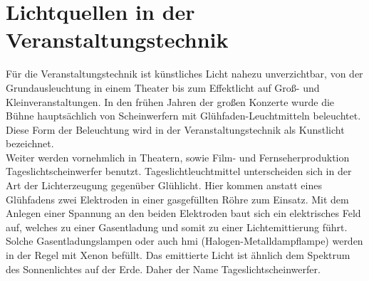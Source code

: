 \documentclass[11pt]{scrartcl}
\begin{document}
\section{Lichtquellen in der Veranstaltungstechnik}
Für die Veranstaltungstechnik ist künstliches Licht nahezu unverzichtbar, von der Grundausleuchtung in einem Theater bis zum Effektlicht
auf Groß- und Kleinveranstaltungen. In den frühen Jahren der großen Konzerte wurde die Bühne hauptsächlich von Scheinwerfern mit
Glühfaden-Leuchtmitteln beleuchtet. Diese Form der Beleuchtung wird in der Veranstaltungstechnik als Kunstlicht bezeichnet.\\
Weiter werden vornehmlich in Theatern, sowie Film- und Fernseherproduktion Tageslichtscheinwerfer benutzt. Tageslichtleuchtmittel
unterscheiden sich in der Art der Lichterzeugung gegenüber Glühlicht. Hier kommen anstatt eines Glühfadens zwei Elektroden in einer
gasgefüllten Röhre zum Einsatz. Mit dem Anlegen einer Spannung an den beiden Elektroden baut sich ein elektrisches Feld auf, welches zu
einer Gasentladung und somit zu einer Lichtemittierung führt. Solche Gasentladungslampen oder auch \ac{hmi} (Halogen-Metalldampflampe)
werden in der Regel mit Xenon befüllt. Das emittierte Licht ist ähnlich dem Spektrum des Sonnenlichtes auf der
Erde. Daher der Name Tageslichtscheinwerfer.
\end{document}
